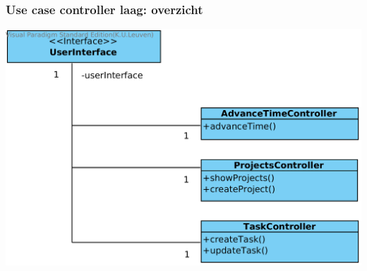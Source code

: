\documentclass[11pt]{beamer}
\begin{document}

\begin{frame}
\frametitle{Use case controller laag: overzicht}
\begin{center}
\includegraphics[width=\textwidth,height=0.8\textheight,keepaspectratio]{uml/use_case_controller_overview.png}
\end{center}
\end{frame}





\end{document}
